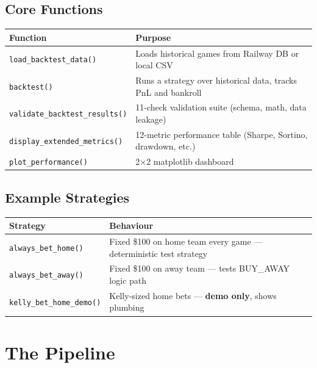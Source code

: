 \documentclass[11pt,a4paper]{article}
\begin{document}
\subsection{Core Functions}

\begin{table}[h]
\centering
\begin{tabular}{@{}lp{9cm}@{}}
\toprule
\textbf{Function} & \textbf{Purpose} \\
\midrule
\texttt{load\_backtest\_data()} & Loads historical games from Railway DB or local CSV \\
\texttt{backtest()} & Runs a strategy over historical data, tracks PnL and bankroll \\
\texttt{validate\_backtest\_results()} & 11-check validation suite (schema, math, data leakage) \\
\texttt{display\_extended\_metrics()} & 12-metric performance table (Sharpe, Sortino, drawdown, etc.) \\
\texttt{plot\_performance()} & 2$\times$2 matplotlib dashboard \\
\bottomrule
\end{tabular}
\end{table}

\subsection{Example Strategies}

\begin{table}[h]
\centering
\begin{tabular}{@{}lp{9cm}@{}}
\toprule
\textbf{Strategy} & \textbf{Behaviour} \\
\midrule
\texttt{always\_bet\_home()} & Fixed \$100 on home team every game --- deterministic test strategy \\
\texttt{always\_bet\_away()} & Fixed \$100 on away team --- tests BUY\_AWAY logic path \\
\texttt{kelly\_bet\_home\_demo()} & Kelly-sized home bets --- \textbf{demo only}, shows plumbing \\
\bottomrule
\end{tabular}
\end{table}

\section{The Pipeline}
\end{document}
